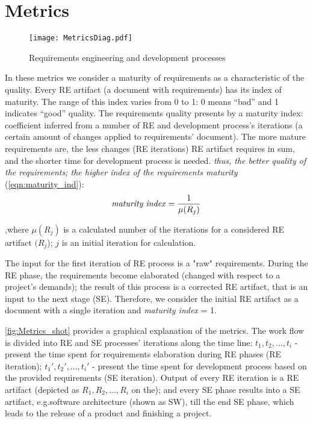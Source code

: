 \section{Metrics}
\label{sec:Solution} 

\begin{figure*}[!h]
	\centering
		\texttt{[image: MetricsDiag.pdf]}
	\caption{Requirements engineering and development processes}
	\label{fig:Metrics_shot}
\end{figure*}




In these metrics we consider a maturity of requirements as a characteristic of the quality.
Every RE artifact (a document with requirements) has its index of maturity. The range of this index varies from 0 to 1: 0 means ``bad'' and 1 indicates ``good'' quality.
The requirements quality presents by a maturity index: coefficient inferred from a number of RE and development process's iterations (a certain amount of changes applied to requirements' document).
The more mature requirements are, the less changes (RE iterations) RE artifact requires in sum, and the shorter time for development process is needed. \textsl{thus, the better quality of the requirements; the higher index of the requirements maturity} (\autoref{eqn:maturity_ind}):
  \begin{equation}\label{eqn:maturity_ind}
\textrm{\textit{maturity index}} = \frac{1}{\mu(R_{j})}
	\end{equation}

,where $\mu(R_{j})$ is a calculated number of the iterations for a considered RE artifact $(R_{j}$); $j$ is an initial iteration for calculation.

The input for the first iteration of RE process is a "raw" requirements. During the RE phase, the requirements become elaborated (changed with respect to a project's demands); the result of this process is a corrected RE artifact, that is an input to the next stage (SE). Therefore, we consider the initial RE artifact as a document with a single iteration and \textit{maturity index} = 1.

\autoref{fig:Metrics_shot} provides a graphical explanation of the metrics. The work flow is divided into RE and SE processes' iterations along the time line: $t_{1},t_{2},...,t_{i}$ - present the time spent for requirements elaboration during RE phases (RE iteration); $t_{1}',t_{2}',...,t_{i}'$ - present the time spent for development process based on the provided requirements (SE iteration).
Output of every RE iteration is a RE artifact (depicted as $R_{1},R_{2},...,R_{i}$ on the); and every SE phase results into a SE artifact, e.g.software architecture (shown as SW), till the end SE phase, which leads to the release of a product and finishing a project.  

